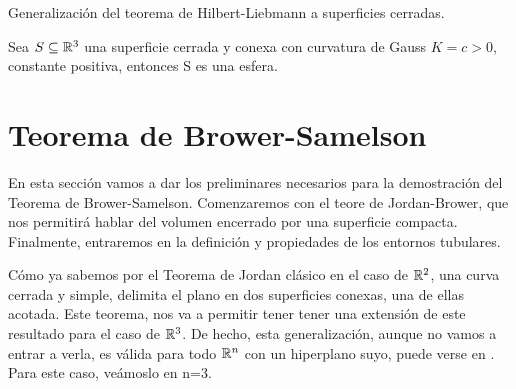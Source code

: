 Generalización del teorema de Hilbert-Liebmann a superficies cerradas.
\begin{theorem}
Sea $S \subseteq \mathbb{R}^3$ una superficie cerrada y conexa con curvatura de Gauss $K=c>0$, constante positiva, entonces S es una esfera.
\end{theorem}


\section{Teorema de Brower-Samelson}

En esta sección vamos a dar los preliminares necesarios para la demostración del Teorema de Brower-Samelson. Comenzaremos con el teore de Jordan-Brower, que nos permitirá hablar del volumen encerrado por una superficie compacta. Finalmente, entraremos en la definición y propiedades de los entornos tubulares.

Cómo ya sabemos por el Teorema de Jordan clásico en el caso de $\mathbb{R}^2$, una curva cerrada y simple, delimita el plano en dos superficies conexas, una de ellas acotada. Este teorema, nos va a permitir tener tener una extensión de este resultado para el caso de $\mathbb{R}^3$. De hecho, esta generalización, aunque no vamos a entrar a verla, es válida para todo $\mathbb{R}^n$ con un hiperplano suyo, puede verse en \cite{paperchicago}. Para este caso, veámoslo en n=3.

